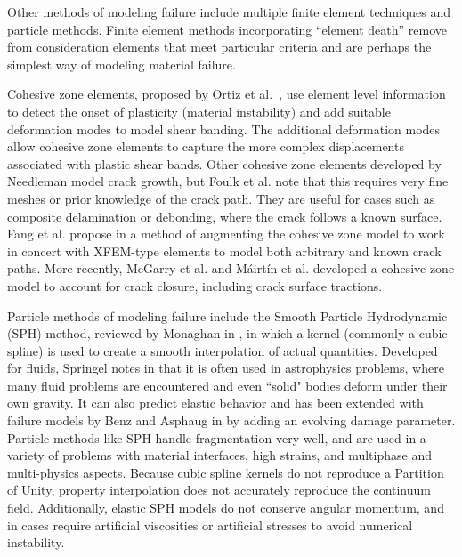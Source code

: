 Other methods of modeling failure include multiple finite element techniques and particle methods.
Finite element methods incorporating ``element death'' remove from consideration elements that meet particular criteria and are perhaps the simplest way of modeling material failure.

Cohesive zone elements, proposed by Ortiz et al.~\cite{ortiz1987finite}, use element level information to detect the onset of plasticity (material instability) and add suitable deformation modes to model shear banding.
The additional deformation modes allow cohesive zone elements to capture the more complex displacements associated with plastic shear bands.
Other cohesive zone elements developed by Needleman\cite{needleman1987continuum} model crack growth, but Foulk et al.\cite{foulk2000formulation} note that this requires very fine meshes or prior knowledge of the crack path.
They are useful for cases such as composite delamination or debonding, where the crack follows a known surface.
Fang et al. propose in \cite{fang2011augmented} a method of augmenting the cohesive zone model to work in concert with XFEM-type elements to model both arbitrary and known crack paths.
More recently, McGarry et al. \cite{mcgarry2014potential} and M\'airt\'in et al. \cite{mairtin2014potential} developed a cohesive zone model to account for crack closure, including crack surface tractions.

Particle methods of modeling failure include the Smooth Particle Hydrodynamic (SPH) method, reviewed by Monaghan in \cite{monaghan2005smoothed}, in which a kernel (commonly a cubic spline) is used to create a smooth interpolation of actual quantities.
Developed for fluids, Springel notes in \cite{springel2010smoothed} that it is often used in astrophysics problems, where many fluid problems are encountered and even ``solid" bodies deform under their own gravity.
It can also predict elastic behavior and has been extended with failure models by Benz and Asphaug in \cite{benz1995simulations} by adding an evolving damage parameter.
Particle methods like SPH handle fragmentation very well, and are used in a variety of problems with material interfaces, high strains, and multiphase and multi-physics aspects.
Because cubic spline kernels do not reproduce a Partition of Unity, property interpolation does not accurately reproduce the continuum field.
Additionally, elastic SPH models do not conserve angular momentum, and in cases require artificial viscosities or artificial stresses to avoid numerical instability.

